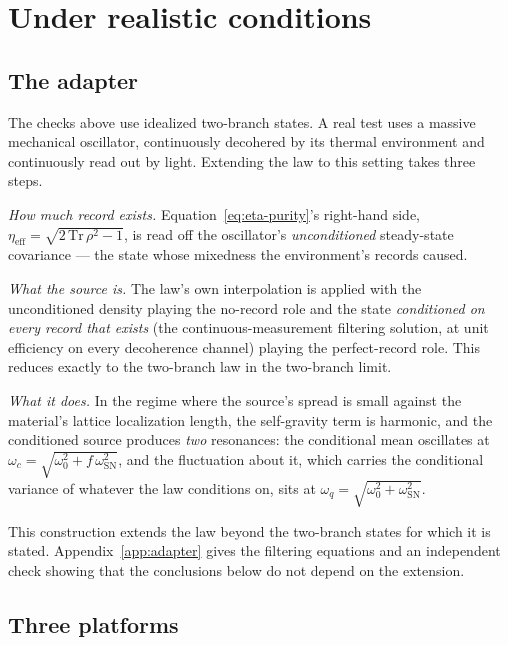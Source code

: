 \documentclass[aps,pra,reprint,amsmath,amssymb,superscriptaddress]{revtex4-2}
\begin{document}
\section{Under realistic conditions}
\label{sec:realistic}

\subsection{The adapter}

The checks above use idealized two-branch states. A real test uses a massive
mechanical oscillator, continuously decohered by its thermal environment and
continuously read out by light. Extending the law to this setting takes three
steps.

\emph{How much record exists.} Equation~\eqref{eq:eta-purity}'s
right-hand side, $\eta_{\mathrm{eff}}=\sqrt{2\,\mathrm{Tr}\,\rho^2-1}$, is
read off the oscillator's \emph{unconditioned} steady-state covariance --- the
state whose mixedness the environment's records caused.

\emph{What the source is.} The law's own interpolation is applied with the
unconditioned density playing the no-record role and the state
\emph{conditioned on every record that exists} (the continuous-measurement
filtering solution, at unit efficiency on every decoherence channel) playing
the perfect-record role. This reduces exactly to the two-branch law in the
two-branch limit. %

\emph{What it does.} In the regime where the source's spread is small against
the material's lattice localization length, the self-gravity term is
harmonic, and the conditioned source produces \emph{two} resonances: the
conditional mean oscillates at $\omega_c=\sqrt{\omega_0^2+f\,\omega_{\mathrm
{SN}}^2}$, and the fluctuation about it, which carries the conditional
variance of whatever the law conditions on, sits at
$\omega_q=\sqrt{\omega_0^2+\omega_{\mathrm{SN}}^2}$.

This construction extends the law beyond the two-branch states for which it
is stated. Appendix~\ref{app:adapter} gives the filtering equations and an
independent check showing that the conclusions below do not depend on the
extension. %

\subsection{Three platforms}
\end{document}
